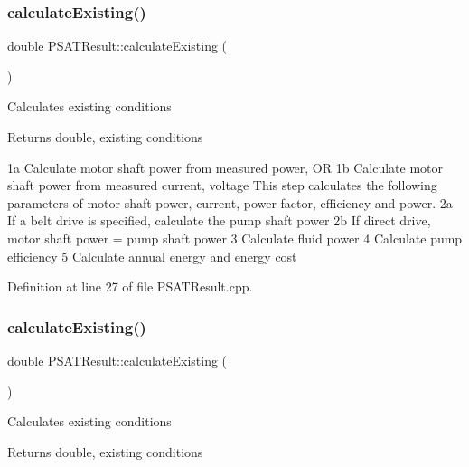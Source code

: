 \subsubsection{\texorpdfstring{calculate\+Existing()}{calculateExisting()}\hspace{0.1cm}{\footnotesize\ttfamily [1/3]}}
{\footnotesize\ttfamily double P\+S\+A\+T\+Result\+::calculate\+Existing (\begin{DoxyParamCaption}{ }\end{DoxyParamCaption})}

Calculates existing conditions \begin{DoxyReturn}{Returns}
double, existing conditions 
\end{DoxyReturn}
1a Calculate motor shaft power from measured power, OR 1b Calculate motor shaft power from measured current, voltage This step calculates the following parameters of motor shaft power, current, power factor, efficiency and power. 2a If a belt drive is specified, calculate the pump shaft power 2b If direct drive, motor shaft power = pump shaft power 3 Calculate fluid power 4 Calculate pump efficiency 5 Calculate annual energy and energy cost

Definition at line 27 of file P\+S\+A\+T\+Result.\+cpp.

\mbox{\label{class_p_s_a_t_result_a594e019e535fb402d6d0441d50f8b697}} 
\subsubsection{\texorpdfstring{calculate\+Existing()}{calculateExisting()}\hspace{0.1cm}{\footnotesize\ttfamily [2/3]}}
{\footnotesize\ttfamily double P\+S\+A\+T\+Result\+::calculate\+Existing (\begin{DoxyParamCaption}{ }\end{DoxyParamCaption})}

Calculates existing conditions \begin{DoxyReturn}{Returns}
double, existing conditions 
\end{DoxyReturn}
\mbox{\label{class_p_s_a_t_result_a594e019e535fb402d6d0441d50f8b697}} 
